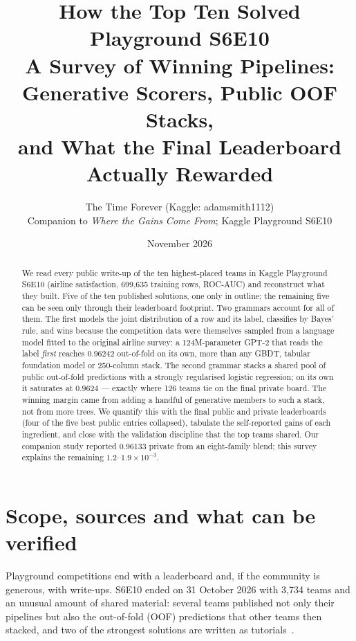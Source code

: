 \documentclass[10pt,a4paper]{article}
\title{\vspace{-1.2cm}\bfseries How the Top Ten Solved Playground S6E10\\[2pt]
\large A Survey of Winning Pipelines: Generative Scorers, Public OOF Stacks,\\
and What the Final Leaderboard Actually Rewarded}
\author{The Time Forever \quad (Kaggle: \textsf{adamsmith1112})\\[2pt]
\small Companion to \emph{Where the Gains Come From}; Kaggle Playground S6E10}
\date{November 2026}
\newcommand{\auc}{ROC-AUC}
\begin{document}
\maketitle

\begin{abstract}
\noindent
We read every public write-up of the ten highest-placed teams in Kaggle Playground S6E10
(airline satisfaction, 699{,}635 training rows, \auc) and reconstruct what they built.
Five of the ten published solutions, one only in outline; the remaining five can be seen
only through their leaderboard footprint. Two grammars account for all of them. The first models the
joint distribution of a row and its label, classifies by Bayes' rule, and wins because the
competition data were themselves sampled from a language model fitted to the original
airline survey: a 124M-parameter GPT-2 that reads the label \emph{first} reaches 0.96242
out-of-fold on its own, more than any GBDT, tabular foundation model or 250-column stack.
The second grammar stacks a shared pool of public out-of-fold predictions with a strongly
regularised logistic regression; on its own it saturates at $0.9624$ --- exactly where 126
teams tie on the final private board. The winning margin came from adding a handful of
generative members to such a stack, not from more trees. We quantify this with the final
public and private leaderboards (four of the five best public entries collapsed), tabulate the
self-reported gains of each ingredient, and close with the validation discipline that the
top teams shared. Our companion study reported 0.96133 private from an eight-family blend;
this survey explains the remaining $1.2$--$1.9\times10^{-3}$.
\end{abstract}

\section{Scope, sources and what can be verified}
\label{sec:scope}

Playground competitions end with a leaderboard and, if the community is generous, with
write-ups. S6E10 ended on 31 October 2026 with 3{,}734 teams and an unusual amount of
shared material: several teams published not only their pipelines but also the
out-of-fold (OOF) predictions that other teams then stacked, and two of the strongest
solutions are written as tutorials~\citep{kaggle_first,kaggle_qft,kaggle_qft2}.
\end{document}
